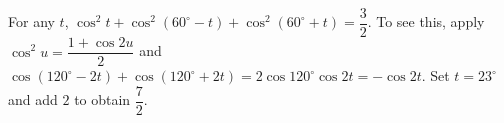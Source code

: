 For any $t$, $\cos^2t+\cos^2(60^\circ-t)+\cos^2(60^\circ+t)=\dfrac{3}{2}$. To see this, apply $\cos^2u=\dfrac{1+\cos2u}{2}$ and $\cos(120^\circ-2t)+\cos(120^\circ+2t)=2\cos120^\circ\cos2t=-\cos2t$. Set $t=23^\circ$ and add $2$ to obtain $\boxed{\dfrac{7}{2}}$.
